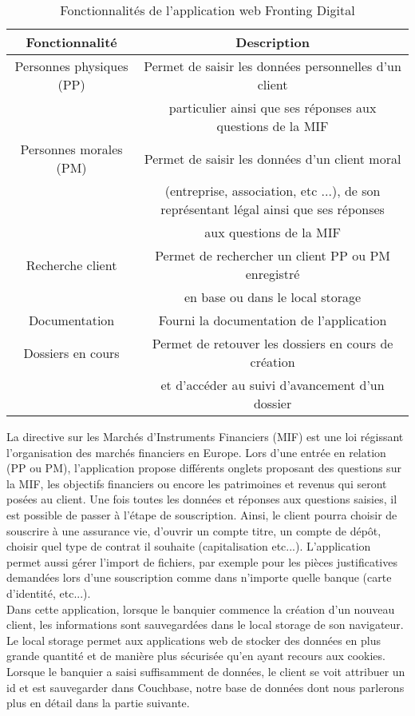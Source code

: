 \begin{table}[h!]
	\center
	\begin{tabular}{| c | c |}
     \hline
     Fonctionnalité & Description \\ \hline
     Personnes physiques (PP) & Permet de saisir les données personnelles d'un client \\ & particulier ainsi que ses réponses aux questions de la MIF\\ \hline
     Personnes morales (PM) & Permet de saisir les données d'un client moral \\ & (entreprise, association, etc ...), de son représentant légal ainsi que ses réponses \\ & aux questions de la MIF\\ \hline
     Recherche client & Permet de rechercher un client PP ou PM enregistré \\ & en base ou dans le local storage \\ \hline
     Documentation & Fourni la documentation de l'application \\ \hline
     Dossiers en cours & Permet de retouver les dossiers en cours de création \\ & et d'accéder au suivi d'avancement d'un dossier\\ \hline
	\end{tabular}
	\caption{Fonctionnalités de l'application web Fronting Digital}
	\label{fonctionnalitesBP1818}
\end{table}

	La directive sur les Marchés d'Instruments Financiers (MIF) est une loi régissant l'organisation des marchés financiers en Europe. Lors d'une entrée en relation (PP ou PM), l'application propose différents onglets proposant des questions sur la MIF, les objectifs financiers ou encore les patrimoines et revenus qui seront posées au client. Une fois toutes les données et réponses aux questions saisies, il est possible de passer à l'étape de souscription. Ainsi, le client pourra choisir de souscrire à une assurance vie, d'ouvrir un compte titre, un compte de dépôt, choisir quel type de contrat il souhaite (capitalisation etc...). L'application permet aussi gérer l'import de fichiers, par exemple pour les pièces justificatives demandées lors d'une souscription comme dans n'importe quelle banque (carte d'identité, etc...). \\
	
	Dans cette application, lorsque le banquier commence la création d'un nouveau client, les informations sont sauvegardées dans le local storage de son navigateur. Le local storage permet aux applications web de stocker des données en plus grande quantité et de manière plus sécurisée qu'en ayant recours aux cookies. Lorsque le banquier a saisi suffisamment de données, le client se voit attribuer un id et est sauvegarder dans Couchbase, notre base de données dont nous parlerons plus en détail dans la partie suivante.